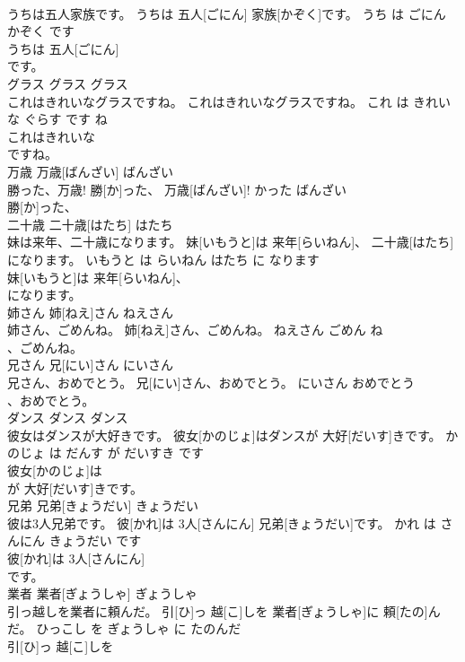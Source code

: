 \documentclass[8pt]{extreport}
\begin{document}
\begin{CJK}{UTF8}{min}
\\	うちは五人家族です。	うちは 五人[ごにん] 家族[かぞく]です。	うち は ごにん かぞく です	
\\	うちは 五人[ごにん]
\\	です。			
\\	グラス	グラス	グラス	
\\	これはきれいなグラスですね。	これはきれいなグラスですね。	これ は きれい な ぐらす です ね	
\\	これはきれいな
\\	ですね。			
\\	万歳	万歳[ばんざい]	ばんざい	
\\	勝った、万歳!	勝[か]った、 万歳[ばんざい]!	かった ばんざい	
\\	勝[か]った、
\\	二十歳	二十歳[はたち]	はたち	
\\	妹は来年、二十歳になります。	妹[いもうと]は 来年[らいねん]、 二十歳[はたち]になります。	いもうと は らいねん はたち に なります	
\\	妹[いもうと]は 来年[らいねん]、
\\	になります。			
\\	姉さん	姉[ねえ]さん	ねえさん	
\\	姉さん、ごめんね。	姉[ねえ]さん、ごめんね。	ねえさん ごめん ね	
\\	、ごめんね。			
\\	兄さん	兄[にい]さん	にいさん	
\\	兄さん、おめでとう。	兄[にい]さん、おめでとう。	にいさん おめでとう	
\\	、おめでとう。			
\\	ダンス	ダンス	ダンス	
\\	彼女はダンスが大好きです。	彼女[かのじょ]はダンスが 大好[だいす]きです。	かのじょ は だんす が だいすき です	
\\	彼女[かのじょ]は
\\	が 大好[だいす]きです。			
\\	兄弟	兄弟[きょうだい]	きょうだい	
\\	彼は3人兄弟です。	彼[かれ]は 3人[さんにん] 兄弟[きょうだい]です。	かれ は さんにん きょうだい です	
\\	彼[かれ]は 3人[さんにん]
\\	です。			
\\	業者	業者[ぎょうしゃ]	ぎょうしゃ	
\\	引っ越しを業者に頼んだ。	引[ひ]っ 越[こ]しを 業者[ぎょうしゃ]に 頼[たの]んだ。	ひっこし を ぎょうしゃ に たのんだ	
\\	引[ひ]っ 越[こ]しを

\end{CJK}
\end{document}
